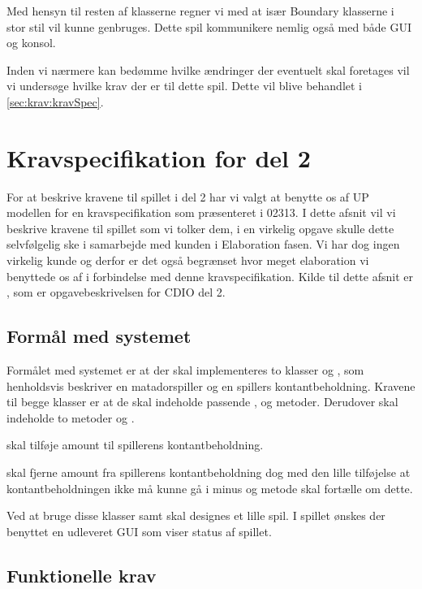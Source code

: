 Med hensyn til resten af klasserne regner vi med at især Boundary klasserne i stor stil vil kunne genbruges. Dette spil kommunikere nemlig også med både GUI og konsol.

Inden vi nærmere kan bedømme hvilke ændringer der eventuelt skal foretages vil vi undersøge hvilke krav der er til dette spil. Dette vil blive behandlet i \vref{sec:krav:kravSpec}.

\section{Kravspecifikation for del 2}\label{sec:krav:kravSpec}
For at beskrive kravene til spillet i del 2 har vi valgt at benytte os af UP modellen for en kravspecifikation som præsenteret i 02313. I dette afsnit vil vi beskrive kravene til spillet som vi tolker dem, i en virkelig opgave skulle dette selvfølgelig ske i samarbejde med kunden i Elaboration fasen. Vi har dog ingen virkelig kunde og derfor er det også begrænset hvor meget elaboration vi benyttede os af i forbindelse med denne kravspecifikation. Kilde til dette afsnit er \cite{CDIOdel2}, som er opgavebeskrivelsen for CDIO del 2.

\subsection{Formål med systemet}\label{sec:krav:kravSpec:formaal}
Formålet med systemet er at der skal implementeres to klasser  og , som henholdsvis beskriver en matadorspiller og en spillers kontantbeholdning. Kravene til begge klasser er at de skal indeholde passende ,  og  metoder. Derudover skal  indeholde to metoder  og .

 skal tilføje amount til spillerens kontantbeholdning.

 skal fjerne amount fra spillerens kontantbeholdning dog med den lille tilføjelse at kontantbeholdningen ikke må kunne gå i minus og metode skal fortælle om dette.

Ved at bruge disse klasser samt  skal designes et lille spil. I spillet ønskes der benyttet en udleveret GUI som viser status af spillet.

\subsection{Funktionelle krav}\label{sec:krav:kravSpec:funkKrav}

